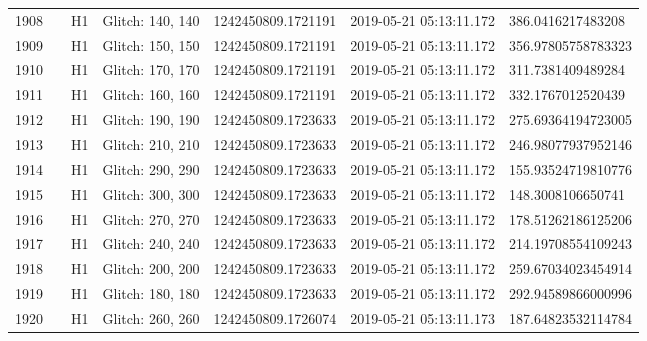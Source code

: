 \begin{longtable}{lllllll}
1908 &                                                    &       H1 &  Glitch: 140, 140 &  1242450809.1721191 &  2019-05-21 05:13:11.172 &   386.0416217483208 \\
1909 &                                                    &       H1 &  Glitch: 150, 150 &  1242450809.1721191 &  2019-05-21 05:13:11.172 &  356.97805758783323 \\
1910 &                                                    &       H1 &  Glitch: 170, 170 &  1242450809.1721191 &  2019-05-21 05:13:11.172 &   311.7381409489284 \\
1911 &                                                    &       H1 &  Glitch: 160, 160 &  1242450809.1721191 &  2019-05-21 05:13:11.172 &   332.1767012520439 \\
1912 &                                                    &       H1 &  Glitch: 190, 190 &  1242450809.1723633 &  2019-05-21 05:13:11.172 &  275.69364194723005 \\
1913 &                                                    &       H1 &  Glitch: 210, 210 &  1242450809.1723633 &  2019-05-21 05:13:11.172 &  246.98077937952146 \\
1914 &                                                    &       H1 &  Glitch: 290, 290 &  1242450809.1723633 &  2019-05-21 05:13:11.172 &  155.93524719810776 \\
1915 &                                                    &       H1 &  Glitch: 300, 300 &  1242450809.1723633 &  2019-05-21 05:13:11.172 &   148.3008106650741 \\
1916 &                                                    &       H1 &  Glitch: 270, 270 &  1242450809.1723633 &  2019-05-21 05:13:11.172 &  178.51262186125206 \\
1917 &                                                    &       H1 &  Glitch: 240, 240 &  1242450809.1723633 &  2019-05-21 05:13:11.172 &  214.19708554109243 \\
1918 &                                                    &       H1 &  Glitch: 200, 200 &  1242450809.1723633 &  2019-05-21 05:13:11.172 &  259.67034023454914 \\
1919 &                                                    &       H1 &  Glitch: 180, 180 &  1242450809.1723633 &  2019-05-21 05:13:11.172 &  292.94589866000996 \\
1920 &                                                    &       H1 &  Glitch: 260, 260 &  1242450809.1726074 &  2019-05-21 05:13:11.173 &  187.64823532114784 \\

\end{longtable}
